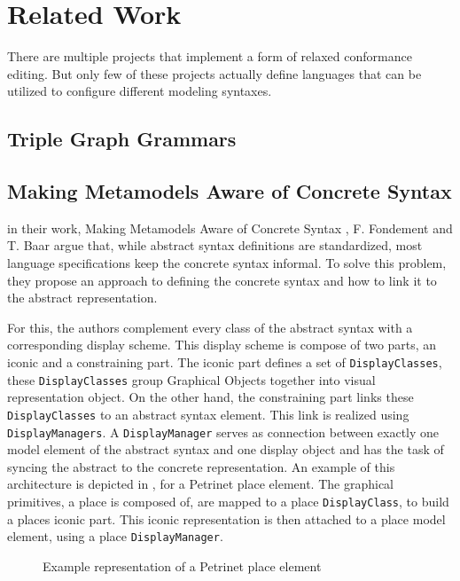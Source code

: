 \chapter{Related Work}
\label{ch:related_work}

There are multiple projects that implement a form of relaxed conformance editing. But only few of these projects actually define languages that can be utilized to configure different modeling syntaxes. 




\section{Triple Graph Grammars}


\section{Making Metamodels Aware of Concrete Syntax}
\label{sec:fondement}
in their work, Making Metamodels Aware of Concrete Syntax \cite{fondement_making_2005}, F. Fondement and T. Baar argue that, while abstract syntax definitions are standardized, most language specifications keep the concrete syntax informal. To solve this problem, they propose an approach to defining the concrete syntax and how to link it to the abstract representation.

For this, the authors complement every class of the abstract syntax with a corresponding display scheme. This display scheme is compose of two parts, an iconic and a constraining part. The iconic part defines a set of \texttt{DisplayClasses}, these \texttt{DisplayClasses} group Graphical Objects together into visual representation object. On the other hand, the constraining part links these \texttt{DisplayClasses} to an abstract syntax element. This link is realized using \texttt{DisplayManagers}. A \texttt{DisplayManager} serves as connection between exactly one model element of the abstract syntax and one display object and has the task of syncing the abstract to the concrete representation. An example of this architecture is depicted in , for a Petrinet place element. The graphical primitives, a place is composed of, are mapped to a place \texttt{DisplayClass}, to build a places iconic part. This iconic representation is then attached to a place model element, using a place \texttt{DisplayManager}.


\begin{figure}[H]
  \centering
  
  \caption{Example representation of a Petrinet place element}
  \label{fig:fondement_dm}
\end{figure}

